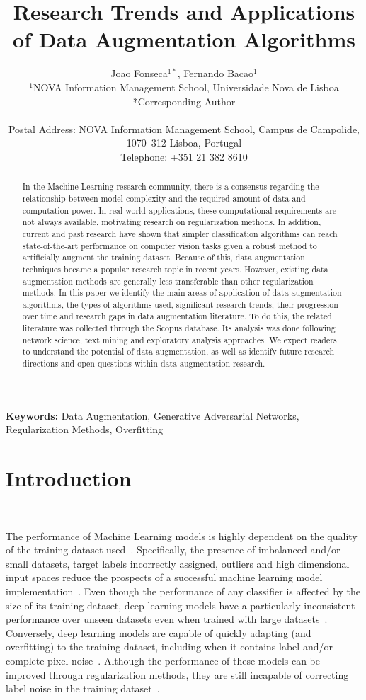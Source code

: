 \documentclass[parskip=full]{scrartcl}
\title{Research Trends and Applications of Data Augmentation Algorithms}
\author{%
	Joao Fonseca\(^{1*}\), Fernando Bacao\(^{1}\)
	\\
	\small{\(^{1}\)NOVA Information Management School, Universidade Nova de Lisboa}
	\\
	\small{*Corresponding Author}
	\\
	\\
	\small{Postal Address: NOVA Information Management School, Campus de
    Campolide, 1070--312 Lisboa, Portugal}
	\\
	\small{Telephone: +351 21 382 8610}
}
\date{}
\begin{document}
\maketitle

\begin{abstract}

    In the Machine Learning research community, there is a consensus regarding
    the relationship between model complexity and the required amount of data
    and computation power. In real world applications, these computational
    requirements are not always available, motivating research on
    regularization methods. In addition, current and past research have shown
    that simpler classification algorithms can reach state-of-the-art
    performance on computer vision tasks given a robust method to artificially
    augment the training dataset. Because of this, data augmentation
    techniques became a popular research topic in recent years. However,
    existing data augmentation methods are generally less transferable than
    other regularization methods. In this paper we identify the main areas of
    application of data augmentation algorithms, the types of algorithms used,
    significant research trends, their progression over time and research gaps
    in data augmentation literature. To do this, the related literature was
    collected through the Scopus database. Its analysis was done following
    network science, text mining and exploratory analysis approaches. We
    expect readers to understand the potential of data augmentation, as well
    as identify future research directions and open questions within data
    augmentation research.

\end{abstract}

\textbf{Keywords:} Data Augmentation, Generative Adversarial Networks, Regularization
Methods, Overfitting

\section{Introduction}~\label{sec:introduction}

The performance of Machine Learning models is highly dependent on the quality
of the training dataset used~\cite{Fenza2021, Halevy2009}. Specifically, the
presence of imbalanced and/or small datasets, target labels incorrectly
assigned, outliers and high dimensional input spaces reduce the prospects of a
successful machine learning model implementation~\cite{Halevy2009,
Domingos2012, Salman2019}.  Even though the performance of any classifier is
affected by the size of its training dataset, deep learning models have a
particularly inconsistent performance over unseen datasets even when trained
with large datasets~\cite{Hu2020, Xie2021}.  Conversely, deep learning models
are capable of quickly adapting (and overfitting) to the training dataset,
including when it contains label and/or complete pixel noise~\cite{Xie2021,
Zhang2021}.  Although the performance of these models can be improved through
regularization methods, they are still incapable of correcting label noise in
the training dataset~\cite{Zhang2021}.
\end{document}
